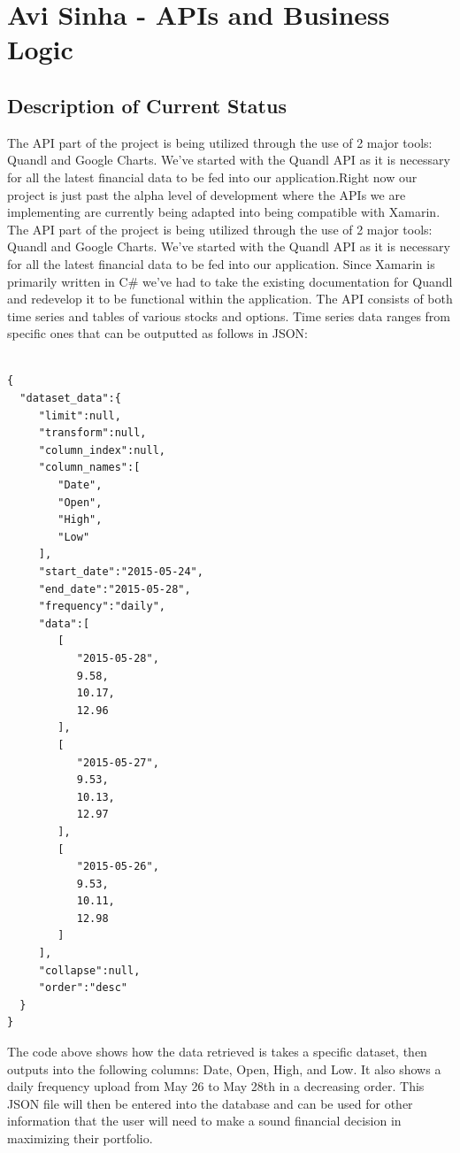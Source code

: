 \documentclass[letterpaper,10pt,titlepage,journal,compsoc,draftclsnofoot,onecolumn]{IEEEtran}
\begin{document}
\section{Avi Sinha - APIs and Business Logic}

\subsection{Description of Current Status}
The API part of the project is being utilized through the use of 2 major tools: Quandl and Google Charts. We've started with the Quandl API as it is necessary for all the latest financial data to be fed into our application.Right now our project is just past the alpha level of development where the APIs we are implementing are currently being adapted into being compatible with Xamarin. 
The API part of the project is being utilized through the use of 2 major tools: Quandl and Google Charts. We've started with the Quandl API as it is necessary for all the latest financial data to be fed into our application. Since Xamarin is primarily written in C\# we've had to take the existing documentation for Quandl and redevelop it to be functional within the application. The API consists of both time series and tables of various stocks and options. Time series data ranges from specific ones that can be outputted as follows in JSON: 

\begin{lstlisting}

{
  "dataset_data":{
     "limit":null,
     "transform":null,
     "column_index":null,
     "column_names":[
        "Date",
        "Open",
        "High",
        "Low"
     ],
     "start_date":"2015-05-24",
     "end_date":"2015-05-28",
     "frequency":"daily",
     "data":[
        [
           "2015-05-28",
           9.58,
           10.17,
           12.96
        ],
        [
           "2015-05-27",
           9.53,
           10.13,
           12.97
        ],
        [
           "2015-05-26",
           9.53,
           10.11,
           12.98
        ]
     ],
     "collapse":null,
     "order":"desc"
  }
}

\end{lstlisting}
The code above shows how the data retrieved is takes a specific dataset, then outputs into the following columns: Date, Open, High, and Low. It also shows a daily frequency upload from May 26 to May 28th in a decreasing order. This JSON file will then be entered into the database and can be used for other information that the user will need to make a sound financial decision in maximizing their portfolio. 
\end{document}
